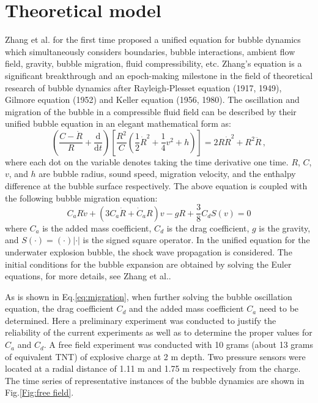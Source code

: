 \documentclass[%
 aip,
 amsmath,amssymb,
 reprint,%
]{revtex4-1}
\begin{document}
{\section{Theoretical model}
\label{s:theory}
Zhang et al.\cite{RN3019} for the first time proposed a unified equation for bubble dynamics which simultaneously considers boundaries, bubble interactions, ambient flow field, gravity, bubble migration, fluid compressibility, etc. Zhang's equation\cite{RN3019} is a significant breakthrough and an epoch-making milestone in the field of theoretical research of bubble dynamics after Rayleigh-Plesset equation\cite{RN2474,RN3043} (1917, 1949), Gilmore equation\cite{RN3044} (1952) and Keller equation\cite{RN2656,Keller1980} (1956, 1980). The oscillation and migration of the bubble in a compressible fluid field can be described by their unified bubble equation in an elegant mathematical form as:
\begin{equation}
\label{eq:unified}
\left( \frac{C-\dot{R}}{R}+\frac{\text{d}}{\text{d}t}  \right) \left[\frac{R^2}{C}\left( \frac{1}{2}\dot{R}^2+\frac{1}{4}v^2+h  \right)    \right]=2R\dot{R}^2+R^2\ddot{R}\, ,
\end{equation}
where each dot on the variable denotes taking the time derivative one time. $R$, $C$, $v$, and $h$ are bubble radius, sound speed, migration velocity, and the enthalpy difference at the bubble surface respectively. { The above equation is coupled with the following bubble migration equation:
\begin{equation}
\label{eq:migration}
C_aR\dot{v}+(3C_a\dot{R}+\dot{C}_{a}R)v-gR+\frac{3}{8}C_dS(v)=0
\end{equation}
where $C_a$ is the added mass coefficient, $C_d$ is the drag coefficient, $g$ is the gravity, and $S(\cdot)=(\cdot )|\cdot|$ is the signed square operator. }In the unified equation for the underwater explosion bubble, the shock wave propagation is considered. The initial conditions for the bubble expansion are obtained by solving the Euler equations, for more details, see  Zhang et al.\cite{RN3019}.

As is shown in Eq.\eqref{eq:migration}, when further solving the bubble oscillation equation, the drag coefficient $C_d$ and the added mass coefficient $C_a$ need to be determined. Here a preliminary experiment was conducted to justify the reliability of the current experiments as well as to determine the proper values for $C_a$ and $C_d$. A free field experiment was conducted with 10 grams (about 13 grams of equivalent TNT) of explosive charge at 2 m depth. Two pressure sensors were located at a radial distance of 1.11 m and 1.75 m respectively from the charge. The time series of representative instances of the bubble dynamics are shown in Fig.\ref{Fig:free field}. 

}
\end{document}

